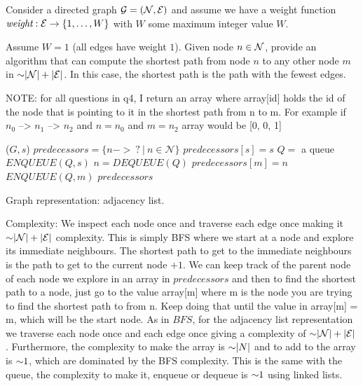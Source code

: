 \begin{problem}
Consider a directed graph $\mathcal{G} = (\mathcal{N}, \mathcal{E})$ and assume we have a weight function $\mathord{\textit{weight}} : \mathcal{E} \rightarrow \{1, \dots, W\}$ with $W$ some maximum integer value $W$.
\begin{questions}
\item Assume $W = 1$ (all edges have weight $1$). Given node $n \in \mathcal{N}$, provide an algorithm that can compute the shortest path from node $n$ to any other node $m$ in $\mathord{\sim}\lvert \mathcal{N} \rvert + \lvert \mathcal{E} \rvert$. In this case, the shortest path is the path with the fewest edges.

NOTE: for all questions in q4, I return an array where array[id] holds the id of the node that is pointing to it in the shortest path from n to m. For example if $n_0$ --> $n_1$ --> $n_2$ and $n=n_0$ and $m=n_2$ array would be [0, 0, 1]

\begin{myalgo}{($G, s$)}
  \STATE $predecessors = \{n -> \:? \:|\: n \in \mathcal{N}\}$
  \STATE $predecessors[s] = s$
  \STATE $Q =$ a queue
  \STATE $ENQUEUE(Q, s)$
    \STATE $n = DEQUEUE(Q)$
        \STATE $predecessors[m] = n$
        \STATE $ENQUEUE(Q, m)$
      \ENDIF
    \ENDFOR
  \ENDWHILE
  \RETURN $predecessors$
\end{myalgo}

Graph representation: adjacency list.

Complexity: We inspect each node once and traverse each edge once making 
it $\mathord{\sim}\lvert \mathcal{N} \rvert + \lvert \mathcal{E} \rvert$ complexity. 
This is simply BFS where we start at a node and explore its 
immediate neighbours. The shortest path to get to the immediate 
neighbours is the path to get to the current node $+ 1$. We can 
keep track of the parent node of each node we explore in an array in $predecessors$ 
and then to find the shortest path to a node, just go to the 
value array[m] where m is the node you are trying to find the 
shortest path to from n. Keep doing that until the value in array[m] = m, which will be the start node. As in $BFS$, for the adjacency list representation 
we traverse each node once and each edge once giving a complexity of $\mathord{\sim}\lvert \mathcal{N} \rvert + \lvert \mathcal{E} \rvert$.
Furthermore, the complexity to make the array is $\mathord{\sim}|N|$ and to add to the array is $\mathord{\sim}1$, which are dominated by the BFS complexity.
This is the same with the queue, the complexity to make it, enqueue or dequeue is $\mathord{\sim}1$ using linked lists.


\end{questions}
\end{problem}
